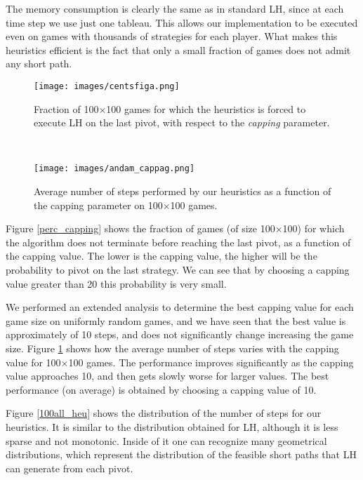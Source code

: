 \documentclass[11pt]{article}
\begin{document}
The memory consumption is clearly the same as in standard LH, since at each
time step we use just one tableau. This allows our implementation to
be executed even on games with thousands of strategies for each player.
What makes this heuristics efficient is the fact that only a small fraction
of games does not admit any short path.

\begin{figure}[h]
\begin{minipage}[t]{6.1cm}
\centering
\texttt{[image: images/centsfiga.png]}
\caption{Fraction of 100$\times$100 games for which the heuristics is
forced to execute LH on the last pivot, with respect to the
\emph{capping} parameter.}
\label{perc_capping}
\end{minipage}
\ \hspace{3mm} \hspace{4mm} \
\begin{minipage}[t]{6.1cm}
\centering
\texttt{[image: images/andam\_cappag.png]}
\caption{Average number of steps performed by our heuristics as a
function of the capping parameter on 100$\times$100 games.}
\label{steps_cap}
\end{minipage}
\end{figure}

Figure \ref{perc_capping} shows the fraction of games (of size
100$\times$100) for which the algorithm does not terminate before
reaching the last pivot, as a function of the capping value. The lower
is the capping value, the higher will be the probability to pivot on
the last strategy. We can see that by choosing a capping value greater
 than 20 this probability is very small.

We performed an extended analysis to determine the best capping
value for each game size on uniformly random games, and we have seen
that the best value is approximately of 10 steps, and does not
significantly change increasing the game size. Figure
\ref{steps_cap} shows how the average number of steps varies with
the capping value for 100$\times$100 games. The performance improves
significantly as the capping value approaches 10, and then gets
slowly worse for larger values. The best performance (on average) is
obtained by choosing a capping value of 10.

Figure \ref{100all_heu} shows the distribution of the number of
steps for our heuristics. It is similar to the distribution obtained
for LH, although it is less sparse and not monotonic. Inside of it
one can recognize many geometrical distributions, which represent
the distribution of the feasible short paths that LH can generate
from each pivot.
\end{document}
